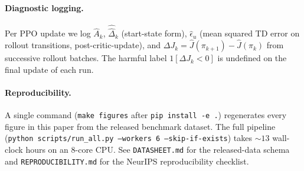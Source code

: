 \documentclass[11pt]{article}
\begin{document}
\paragraph{Diagnostic logging.}
Per PPO update we log $\widehat{A}_k$, $\widehat{\hat\Delta}_k$ (start-state form), $\widehat\epsilon_u$ (mean squared TD error on rollout transitions, post-critic-update), and $\Delta J_k = \widehat{J}(\pi_{k+1}) - \widehat{J}(\pi_k)$ from successive rollout batches. The harmful label $1[\Delta J_k < 0]$ is undefined on the final update of each run.

\paragraph{Reproducibility.}
A single command (\texttt{make figures} after \texttt{pip install -e .}) regenerates every figure in this paper from the released benchmark dataset. The full pipeline (\texttt{python scripts/run\_all.py --workers 6 --skip-if-exists}) takes $\sim 13$ wall-clock hours on an 8-core CPU. See \texttt{DATASHEET.md} for the released-data schema and \texttt{REPRODUCIBILITY.md} for the NeurIPS reproducibility checklist.
\end{document}
